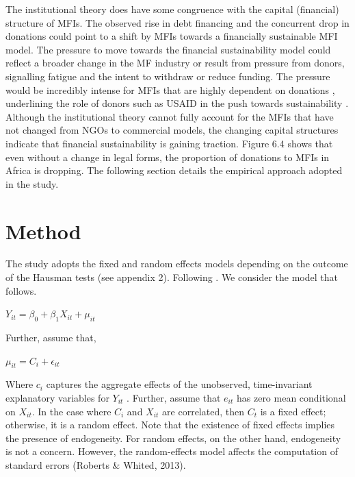 \documentclass[a4paper, nobind]{templates/ociamthesis}
\begin{document}
The institutional theory does have some congruence with the capital (financial) structure of MFIs. The observed rise in debt financing and the concurrent drop in donations could point to a shift by MFIs towards a financially sustainable MFI model. The pressure to move towards the financial sustainability model could reflect a broader change in the MF industry or result from pressure from donors, signalling fatigue and the intent to withdraw or reduce funding. The pressure would be incredibly intense for MFIs that are highly dependent on donations \autocite{powell2012new}, underlining the role of donors such as USAID in the push towards sustainability \autocite{bateman2010doesn}. Although the institutional theory cannot fully account for the MFIs that have not changed from NGOs to commercial models, the changing capital structures indicate that financial sustainability is gaining traction. Figure 6.4 shows that even without a change in legal forms, the proportion of donations to MFIs in Africa is dropping. The following section details the empirical approach adopted in the study.

\hypertarget{method-2}{%
\section{Method}\label{method-2}}

The study adopts the fixed and random effects models depending on the outcome of the Hausman tests (see appendix 2). Following \textcite{roberts2013endogeneity}. We consider the model that follows.

\(Y_{it} = \beta_{0} + \beta_{1}X_{it} + \mu_{it}\)

Further, assume that,

\(\mu_{it} = C_{i} + \epsilon_{it}\)

Where \(c_{i}\) captures the aggregate effects of the unobserved, time-invariant explanatory variables for \(Y_{it}\) . Further, assume that \(e_{it}\) has zero mean conditional on \(X_{it}\). In the case where \(C_{i}\) and \(X_{it}\) are correlated, then \(C_{t}\) is a fixed effect; otherwise, it is a random effect. Note that the existence of fixed effects implies the presence of endogeneity. For random effects, on the other hand, endogeneity is not a concern. However, the random-effects model affects the computation of standard errors (Roberts \& Whited, 2013).
\end{document}
